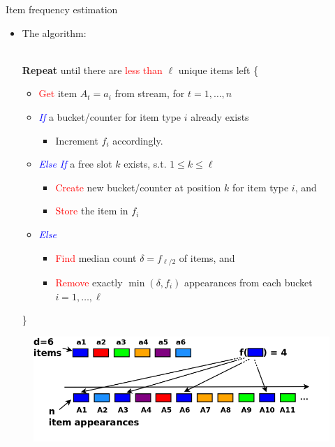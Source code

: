 \documentclass[first=dgreen,second=purple,logo=redque]{aaltoslides}
\begin{document}
\begin{frame}[allowframebreaks=1]{Item frequency estimation}

\begin{itemize}
	\item The algorithm:
	\begin{algorithmic}
		\\\State \textbf{Repeat} until there are \textcolor{red}{less than}
		$\ell$ \textcolor{dgreen}{unique} items left \{
		\begin{itemize}
			\item \textcolor{red}{Get} item $A_{t} = a_{i}$ from stream, for $t = 1, \ldots, n$
		\end{itemize}
		\begin{itemize}
			\item \textcolor{blue}{\textit{If}} a bucket/counter for item type $i$ already exists
				\begin{itemize}\item Increment $f_{i}$ accordingly.\end{itemize}
			\item \textcolor{blue}{\textit{Else If}} a free slot $k$ exists, s.t. $1 \leq k \leq \ell$
			\begin{itemize}
				\item \textcolor{red}{Create} new bucket/counter at position $k$ for item type $i$, and
				\item \textcolor{red}{Store} the item in $f_{i}$
			\end{itemize}
			\item \textcolor{blue}{\textit{Else}}
				\begin{itemize}
					\item \textcolor{red}{Find} \textcolor{dgreen}{median} count $\delta = f_{\ell/2}$
					of items, and
					\item \textcolor{red}{Remove} exactly $\min{(\delta, f_{i})}$ appearances from each bucket $i = 1, \ldots, \ell$
				\end{itemize}
		\end{itemize}
		\State \}
	\end{algorithmic}
\end{itemize}

\framebreak

\begin{figure}
  \includegraphics[scale=0.32]{plots/fi1}
 \label{fig:fi1}
\end{figure}


\end{frame}
\end{document}
